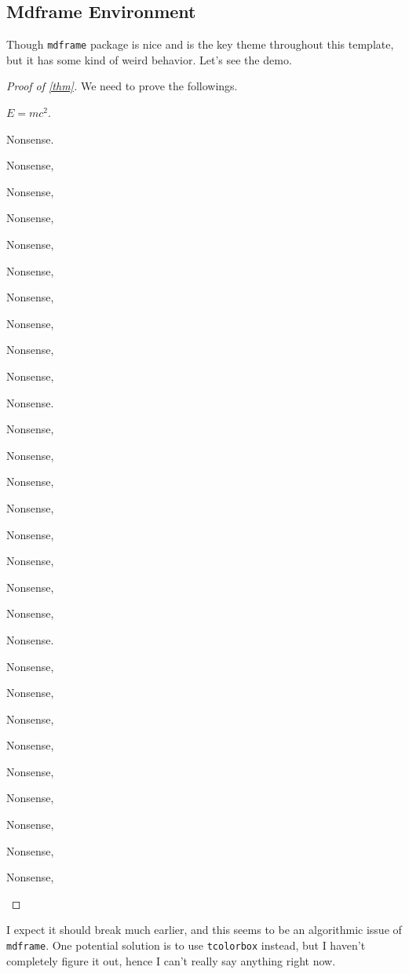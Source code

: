 \subsection{Mdframe Environment}
Though \texttt{mdframe} package is nice and is the key theme throughout this template, but it has some kind of weird behavior. Let's see the demo.
\begin{proof}[Proof of \autoref{thm}]
	We need to prove the followings.
	\begin{claim}
		\(E = mc^{2} \).
	\end{claim}
	\begin{explanation}

		Nonsense.

		Nonsense,

		Nonsense,

		Nonsense,

		Nonsense,

		Nonsense,

		Nonsense,

		Nonsense,

		Nonsense,

		Nonsense,

		Nonsense.

		Nonsense,

		Nonsense,

		Nonsense,

		Nonsense,

		Nonsense,

		Nonsense,

		Nonsense,

		Nonsense,

		Nonsense.

		Nonsense,

		Nonsense,

		Nonsense,

		Nonsense,

		Nonsense,

		Nonsense,

		Nonsense,

		Nonsense,

		Nonsense,
	\end{explanation}

\end{proof}

I expect it should break much earlier, and this seems to be an algorithmic issue of \texttt{mdframe}. One potential solution is to use \texttt{tcolorbox} instead,
but I haven't completely figure it out, hence I can't really say anything right now.